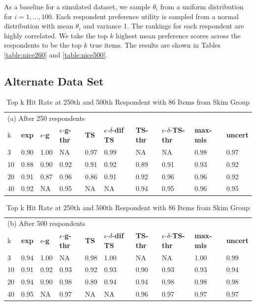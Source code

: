 \documentclass[a4paper,11pt]{article}
\newcommand{\fixedexpressS}{\textbf{exp}}
\newcommand{\egreedyS}{$\epsilon$-\textbf{g}}
\newcommand{\egreedythresS}{$\epsilon$-\textbf{g-thr}}
\newcommand{\misminS}{\textbf{max-mis}}
\newcommand{\tsS}{\textbf{TS} }
\newcommand{\edtsS}{$\epsilon$-$\delta$-\textbf{dif TS} }
\newcommand{\tsthresS}{\textbf{TS-thr} }
\newcommand{\edtsthresS}{$\epsilon$-$\delta$-\textbf{TS-thr} }
\newcommand{\uncertS}{\textbf{uncert} }
\begin{document}
As a baseline for a simulated dataset, we sample $\theta_i$ from a uniform distribution for $i=1,\ldots,100$. Each respondent preference utility is sampled from a normal distribution with mean $\theta_i$ and variance 1. The rankings for each respondent are highly correlated. We take the top $k$ highest mean preference scores across the respondents to be the top $k$ true items. The results are shown in Tables \ref{table:nice260} and \ref{table:nice500}.

\subsection{Alternate Data Set}

\begin{table}
\caption{Top k Hit Rate at 250th and 500th Respondent with 86 Items from Skim Group}
\label{table:skim}
\begin{center}
\begin{tabular}{llllllllll}
\hline 
\hline
\multicolumn{10}{l}{(a) After 250 respondents}\\
k &  \fixedexpressS&\egreedyS&\egreedythresS&\tsS&\edtsS&\tsthresS&\edtsthresS& \misminS& \uncertS \\ \hline
  3 & 0.90 &   1.00 &  NA &   0.97 & 0.99 & NA & NA &    0.98 &   0.97 \\
  10 &  0.88 &   0.90 & 0.92 &   0.91 & 0.92 & 0.89 & 0.91 &    0.93 &   0.92 \\
  20 & 0.91 & 0.87 &  0.96 & 0.86 & 0.91 & 0.92 & 0.96 &  0.96 &   0.92 \\  
  40 &  0.92 &   NA &  0.95 &  NA & NA & 0.94 & 0.95 &  0.96 &   0.95 \\
\hline
\hline
\end{tabular}
\begin{tabular}{llllllllll}
\multicolumn{10}{l}{(b) After 500 respondents}\\
k &  \fixedexpressS&\egreedyS&\egreedythresS&\tsS&\edtsS&\tsthresS&\edtsthresS& \misminS& \uncertS  \\
\hline
   3 & 0.94 & 1.00 & NA & 0.98 & 1.00 & NA & NA & 1.00 &   0.99 \\
  10 &  0.91 &   0.92 &  0.93 &   0.92 & 0.93 & 0.90 & 0.93 &    0.93 &   0.94 \\  
  20 &  0.94 &   0.90 & 0.98 &  0.89 & 0.94 & 0.94 & 0.98 &  0.98 &   0.98 \\ 
  40 &  0.95 &   NA & 0.97 & NA & NA & 0.96 &  0.97 & 0.97 & 0.97 \\
\hline 
\hline
\end{tabular}
\end{center}
\end{table}
\end{document}
